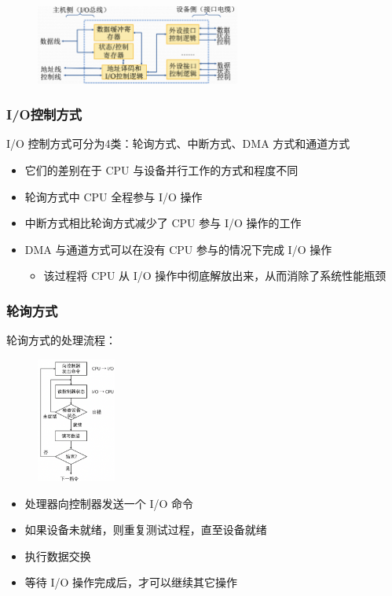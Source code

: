 \documentclass[cs4size,a4paper,10pt]{ctexart}
\begin{document}
	\begin{figure}[H]
		\centering
		\includegraphics[width=0.6\textwidth]{img/4.1.2.1}
	\end{figure}

	\subsubsection{I/O控制方式}
	I/O 控制方式可分为4类：轮询方式、中断方式、DMA 方式和通道方式
	\begin{itemize}
		\item 它们的差别在于 CPU 与设备并行工作的方式和程度不同
		\item 轮询方式中 CPU 全程参与 I/O 操作
		\item 中断方式相比轮询方式减少了 CPU 参与 I/O 操作的工作
		\item DMA 与通道方式可以在没有 CPU 参与的情况下完成 I/O 操作
		\begin{itemize}
			\item 该过程将 CPU 从 I/O 操作中彻底解放出来，从而消除了系统性能瓶颈
		\end{itemize}
	\end{itemize}

	\subsubsection{轮询方式}
	轮询方式的处理流程：

	\begin{figure}[H]
		\centering
		\includegraphics[width=0.23\textwidth]{img/4.1.2.3}
	\end{figure}
	\begin{itemize}
		\item 处理器向控制器发送一个 I/O 命令
		\item 如果设备未就绪，则重复测试过程，直至设备就绪
		\item 执行数据交换
		\item 等待 I/O 操作完成后，才可以继续其它操作
	\end{itemize}
\end{document}
